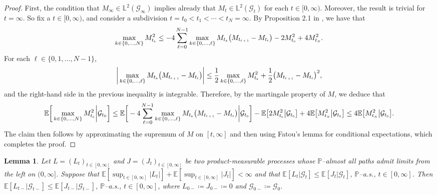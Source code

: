 \documentclass[10pt]{article} %
\newtheorem{lemma}[theorem]{Lemma}
\newcommand\cG{\mathcal G}
\newcommand{\smalltext}[1]{\text{\fontsize{4}{4}\selectfont$#1$}}
\def \E{\mathbb{E}}
\def \L{\mathbb{L}}
\def \P{\mathbb{P}}
\begin{document}
\begin{proof}
	First, the condition that $M_\infty \in \L^2(\cG_\infty)$ implies already that $M_t \in \L^2(\cG_t)$ for each $t \in [0,\infty)$. Moreover, the result is trivial for $t = \infty$. So fix a $t \in [0,\infty)$, and consider a subdivision $t = t_0 < t_1 < \cdots  < t_N = \infty$. By Proposition 2.1 in \cite{acciaio2013trajectorial}, we have that
	\begin{equation*}
		\max_{k \in \{0,\ldots,N\}} M^2_{t_\smalltext{k}} \leq -4 \sum_{\ell = 0}^{N-1}  \max_{k \in \{0,\ldots,\ell\}} M_{t_\smalltext{k}} \big(M_{t_\smalltext{\ell+1}} - M_{t_\smalltext{\ell}}\big) - 2 M^2_{t_\smalltext{0}} + 4 M^2_{t_\smalltext{N}}.
	\end{equation*}
	For each $\ell \in \{0,1,\ldots,N-1\}$,
	\begin{equation*}
		\bigg|\max_{k \in \{0,\ldots,\ell\}} M_{t_\smalltext{k}} \big(M_{t_\smalltext{\ell+1}} - M_{t_\smalltext{\ell}}\big)\bigg| \leq \frac{1}{2}\max_{k \in \{0,\ldots,\ell\}} M^2_{t_\smalltext{k}} + \frac{1}{2}\big(M_{t_\smalltext{\ell+1}} - M_{t_\smalltext{\ell}}\big)^2,
	\end{equation*}
	and the right-hand side in the previous inequality is integrable. Therefore, by the martingale property of $M$, we deduce that
	\begin{align*}
		\E\bigg[ \max_{k \in \{0,\ldots,N\}} M^2_{t_\smalltext{k}} \bigg| \cG_{t_0} \bigg] \leq \E\bigg[ -4 \sum_{\ell = 0}^{N-1}  \max_{k \in \{0,\ldots,\ell\}} M_{t_\smalltext{k}} \big(M_{t_\smalltext{\ell+1}} - M_{t_\smalltext{\ell}}\big) \bigg| \cG_{t_\smalltext{0}} \bigg] - \E\big[ 2 M^2_{t_\smalltext{0}} \big| \cG_{t_\smalltext{0}}\big] + 4 \E\big[ M^2_{t_\smalltext{N}} \big| \cG_{t_\smalltext{0}} \big] \leq 4 \E\big[ M^2_{t_\smalltext{N}} \big| \cG_{t_\smalltext{0}} \big].
	\end{align*}
	The claim then follows by approximating the supremum of $M$ on $[t,\infty]$ and then using Fatou's lemma for conditional expectations, which completes the proof.
\end{proof}


\begin{lemma}\label{lem::increas_cond_mean}
	Let $L = (L_t)_{t \in [0,\infty]}$ and $J = (J_t)_{t\in[0,\infty]}$ be two product-measurable processes whose $\P$--almost all paths admit limits from the left on $(0,\infty]$. Suppose that $\E[\sup_{t \in [0,\infty]}|L_t|] + \E[\sup_{t \in [0,\infty]}|J_t|] < \infty$ and that $\E[L_t|\cG_t] \leq \E[J_t|\cG_t]$, $\P$--a.s., $t \in [0,\infty]$. Then $\E[L_{t-}|\cG_{t-}] \leq \E[J_{t-}|\cG_{t-}]$, $\P$--a.s., $t \in [0,\infty]$, where $L_{0-} \coloneqq J_{0-} \coloneqq 0$ and $\cG_{0-} \coloneqq \cG_0$.
\end{lemma}
\end{document}
